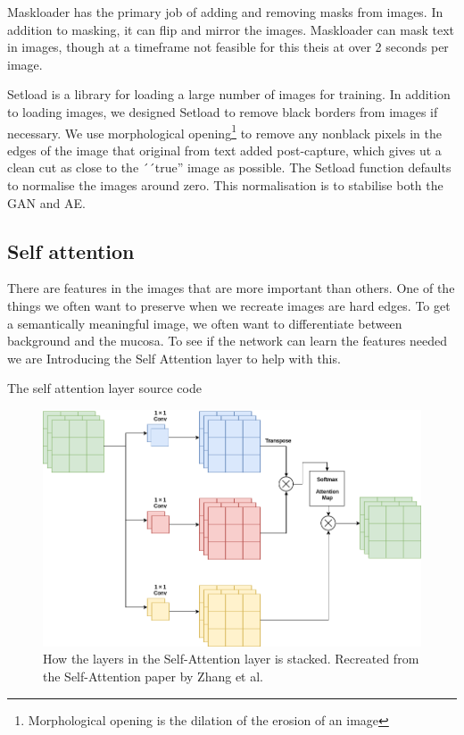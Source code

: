 Maskloader has the primary job of adding and removing masks from images. In addition to masking, it can flip and mirror the images. Maskloader can mask text in images, though at a timeframe not feasible for this theis at over 2 seconds per image. 

Setload is a library for loading a large number of images for training. In addition to loading images, we designed Setload to remove black borders from images if necessary. 
We use morphological opening\footnote{Morphological opening is the dilation of the erosion of an image } to remove any nonblack pixels in the edges of the image that original from text added post-capture, which gives ut a clean cut as close to the ´´true'' image as possible. The Setload function defaults to normalise the images around zero. This normalisation is to stabilise both the GAN and AE.


\subsection{Self attention}
There are features in the images that are more important than others. One of the things we often want to preserve when we recreate images are hard edges. To get a semantically meaningful image,  we often want to differentiate between background and the mucosa. 
To see if the network can learn the features needed we are Introducing the Self Attention layer to help with this. 

\begin{minipage}{\linewidth}
\begin{listing}

\caption{The self attention layer source code}
\label{listing:Attention}
\end{listing}
\end{minipage}

\begin{figure}[h]
\centering
\includegraphics[scale=0.4]{methodology/figures/attention.png}
\caption{How the layers in the Self-Attention layer is stacked. Recreated from the Self-Attention  paper by Zhang et al.~\cite{DBLP:journals/corr/selfattention}}
\label{fig:Attention}
\end{figure}



